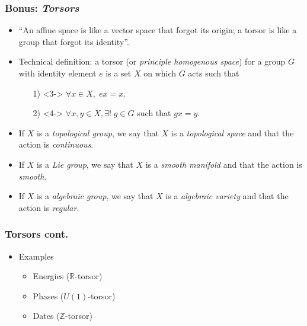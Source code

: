 \documentclass{beamer}
\begin{document}
\begin{frame}
    \frametitle{Bonus: \textit{Torsors}}
    \begin{itemize}
        \item<1-> ``An affine space is like a vector space that forgot its origin; a torsor is like a group that forgot its identity''.
        \item<2-> Technical definition: a torsor (or \textit{principle homogenous space}) for a group $G$ with identity element $e$ is a set $X$ on which $G$ acts such that
        \begin{itemize}
            \item[1)]<3-> $\forall x \in X, \; ex = x$.
            \item[2)]<4-> $\forall x,y\in X, \exists ! \; g\in G$ such that $gx = y$.
        \end{itemize} 
        \item<5-> If $X$ is a \textit{topological group}, we say  that $X$ is a \textit{topological space} and that the action is \textit{continuous}. 
        \item<6-> If $X$ is a \textit{Lie group}, we say  that $X$ is a \textit{smooth manifold} and that the action is \textit{smooth}.
        \item<7-> If $X$ is a \textit{algebraic group}, we say  that $X$ is a \textit{algebraic variety} and that the action is \textit{regular}.  
    \end{itemize}
\end{frame}

\begin{frame}
    \frametitle{Torsors cont.}
    \begin{itemize}
        \item<1-> Examples
        \begin{itemize}
            \item<2-> Energies ($\mathbb{R}$-torsor)
            \item<3-> Phases ($U(1)$-torsor)
            \item<4-> Dates ($\mathbb{Z}$-torsor)
        \end{itemize}
    \end{itemize}

\end{frame}
\end{document}
